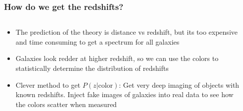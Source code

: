 \documentclass{beamer}
\begin{document}
\frame
{
    \frametitle{How do we get the redshifts?}


    \begin{columns}
        \begin{column}{0.5\textwidth}    
            \begin{itemize}

                \item The prediction of the theory is distance vs redshift, but
                    its too expensive and time consuming to get a spectrum
                    for all galaxies

                \item Galaxies look redder at higher redshift, so we can use
                    the colors to statistically determine the distribution
                    of redshifts

                \item Clever method to get $P(z | \mathrm{color})$: Get very
                    deep imaging of objects with known redshifts.  Inject fake
                    images of galaxies into real data to see how the colors
                    scatter when measured

            \end{itemize}
        \end{column}
        \begin{column}{0.5\textwidth}
        \end{column}
    \end{columns}


}
\end{document}
